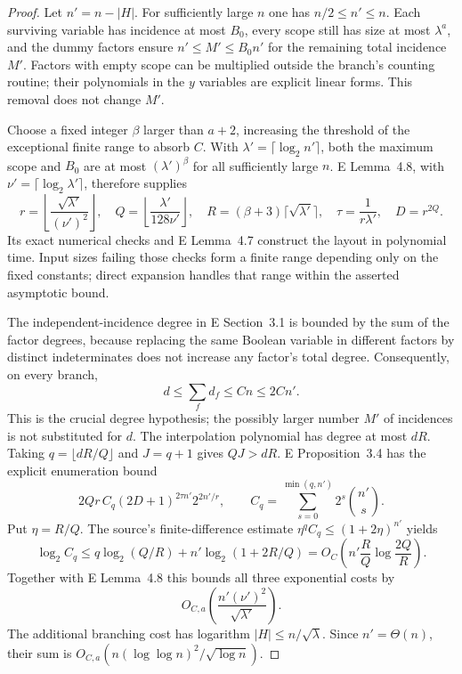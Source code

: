 \begin{proof}
Let $n'=n-|H|$.  For sufficiently large $n$ one has
$n/2\le n'\le n$.  Each surviving variable has incidence at
most $B_0$, every scope still has size at most $\lambda^a$,
and the dummy factors ensure $n'\le M'\le B_0n'$ for the
remaining total incidence $M'$.  Factors with empty scope
can be multiplied outside the branch's counting routine;
their polynomials in the $y$ variables are explicit linear
forms.  This removal does not change $M'$.

Choose a fixed integer $\beta$ larger than $a+2$, increasing
the threshold of the exceptional finite range to absorb
$C$.  With $\lambda'=\lceil\log_2 n'\rceil$, both the maximum
scope and $B_0$ are at most $(\lambda')^\beta$ for all
sufficiently large $n$.  E Lemma~4.8, with
$\nu'=\lceil\log_2\lambda'\rceil$, therefore supplies
\[
 r=\left\lfloor\frac{\sqrt{\lambda'}}{(\nu')^2}\right\rfloor,
 \quad Q=\left\lfloor\frac{\lambda'}{128\nu'}\right\rfloor,
 \quad R=(\beta+3)\lceil\sqrt{\lambda'}\rceil,
 \quad \tau=\frac1{r\lambda'},\quad D=r^{2Q}.
\]
Its exact numerical checks and E Lemma~4.7 construct the
layout in polynomial time.  Input sizes failing those
checks form a finite range depending only on the fixed
constants; direct expansion handles that range within
the asserted asymptotic bound.

The independent-incidence degree in E Section~3.1 is bounded
by the sum of the factor degrees, because replacing the
same Boolean variable in different factors by distinct
indeterminates does not increase any factor's total degree.
Consequently, on every branch,
\[
       d\le\sum_f d_f\le Cn\le 2Cn'.
\]
This is the crucial degree hypothesis; the possibly larger
number $M'$ of incidences is not substituted for $d$.
The interpolation polynomial has degree at most $dR$.
Taking $q=\lfloor dR/Q\rfloor$ and $J=q+1$ gives $QJ>dR$.
E Proposition~3.4 has the explicit enumeration bound
\[
       2Qr\,C_q(2D+1)^{2\tau n'}2^{2n'/r},\qquad
       C_q=\sum_{s=0}^{\min(q,n')}2^s\binom{n'}s.
\]
Put $\eta=R/Q$.  The source's finite-difference estimate
$\eta^qC_q\le(1+2\eta)^{n'}$ yields
\[
 \log_2 C_q
 \le q\log_2(Q/R)+n'\log_2(1+2R/Q)
 =O_C\!\left(n'\frac RQ\log\frac{2Q}{R}\right).
\]
Together with E Lemma~4.8 this bounds all three exponential
costs by
\[
 O_{C,a}\!\left(\frac{n'(\nu')^2}{\sqrt{\lambda'}}\right).
\]
The additional branching cost has logarithm
$|H|\le n/\sqrt\lambda$.  Since $n'=\Theta(n)$, their sum
is $O_{C,a}(n(\log\log n)^2/\sqrt{\log n})$.


\end{proof}
